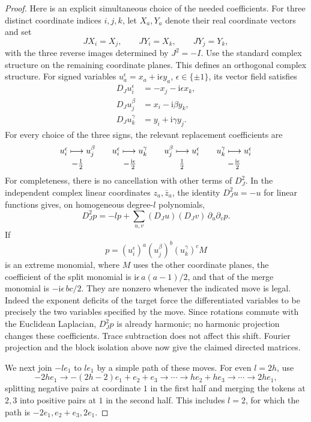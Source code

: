 \begin{proof}
Here is an explicit simultaneous choice of the needed coefficients.
For three distinct coordinate indices \(i,j,k\), let \(X_a,Y_a\)
denote their real coordinate vectors and set
\[
 JX_i=X_j,\qquad JY_i=X_k,\qquad JY_j=Y_k,
\]
with the three reverse images determined by \(J^2=-I\).
Use the standard complex structure on the remaining coordinate
planes.  This defines an orthogonal complex structure.  For signed
variables \(u_a^\epsilon=x_a+\mathrm i\epsilon y_a\),
\(\epsilon\in\{\pm1\}\), its vector field satisfies
\[
 \begin{split}
 D_Ju_i^\epsilon&=-x_j-\mathrm i\epsilon x_k,\\
 D_Ju_j^\beta&=x_i-\mathrm i\beta y_k,\\
 D_Ju_k^\gamma&=y_i+\mathrm i\gamma y_j.
 \end{split}
\]
For every choice of the three signs, the relevant replacement coefficients are
\[
 \begin{array}{c@{\qquad}c@{\qquad}c@{\qquad}c}
 u_i^\epsilon\longmapsto u_j^\beta&
 u_i^\epsilon\longmapsto u_k^\gamma&
 u_j^\beta\longmapsto u_i^\epsilon&
 u_k^\gamma\longmapsto u_i^\epsilon
 \\[3pt]
 -\frac12&-\frac{\mathrm i\epsilon}{2}&
 \frac12&-\frac{\mathrm i\epsilon}{2}
 \end{array}
\]
For completeness, there is no cancellation with other terms of
\(D_J^2\).  In the independent complex linear coordinates
\(z_a,\bar z_a\), the identity \(D_J^2u=-u\) for linear functions gives,
on homogeneous degree-\(l\) polynomials,
\[
 D_J^2p=-lp+
   \sum_{u,v}(D_Ju)(D_Jv)\,\partial_u\partial_vp.
\]
If
\[
 p=(u_i^\epsilon)^a(u_j^\beta)^b(u_k^\gamma)^c M
\]
is an extreme monomial, where \(M\) uses the other coordinate
planes, the coefficient of the split monomial is
\(\mathrm i\epsilon\,a(a-1)/2\), and that of the merge monomial is
\(-\mathrm i\epsilon\,bc/2\).  They are nonzero whenever the indicated
move is legal.  Indeed the exponent deficits of the target force
the differentiated variables to be precisely the two variables
specified by the move.  Since rotations commute with the Euclidean
Laplacian, \(D_J^2p\) is already harmonic; no harmonic projection
changes these coefficients.  Trace subtraction does not affect this
shift.  Fourier projection and the block isolation above now give
the claimed directed matrices.

We next join \(-le_1\) to \(le_1\) by a simple path of these moves.
For even \(l=2h\), use
\[
 -2he_1\longrightarrow
 -(2h-2)e_1+e_2+e_3\longrightarrow\cdots
 \longrightarrow he_2+he_3
 \longrightarrow\cdots\longrightarrow 2he_1,
\]
splitting negative pairs at coordinate \(1\) in the first half and
merging the tokens at \(2,3\) into positive pairs at \(1\) in the
second half.  This includes \(l=2\), for which the path is
\(-2e_1,e_2+e_3,2e_1\).


\end{proof}
